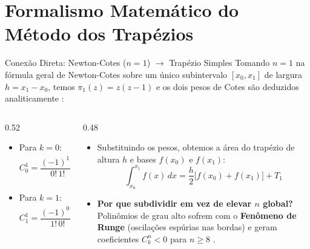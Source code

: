 \documentclass[aspectratio=169]{beamer}
\newcommand{\emphred}[1]{\textcolor{secondary}{\textbf{#1}}}
\begin{document}
\section{Formalismo Matemático do Método dos Trapézios}

\begin{frame}{Conexão Direta: Newton-Cotes ($n=1$) $\rightarrow$ Trapézio Simples}
\footnotesize
Tomando $n = 1$ na fórmula geral de Newton-Cotes sobre um único subintervalo $[x_0, x_1]$ de largura $h = x_1 - x_0$, temos $\pi_1(z) = z(z - 1)$ e os dois pesos de Cotes são deduzidos analiticamente \cite{santos2010, mesquita2026}:

\begin{columns}[T]
\begin{column}{0.52\textwidth}
\begin{bee}
\begin{itemize}\scriptsize
    \item Para $k = 0$:
    \[
    C_0^1 = \frac{(-1)^1 h}{0!\,1!} \int_0^1 (z - 1)\,dz = -h \left[\frac{z^2}{2} - z\right]_0^1 = \frac{h}{2}
    \]
    \item Para $k = 1$:
    \[
    C_1^1 = \frac{(-1)^0 h}{1!\,0!} \int_0^1 z\,dz = h \left[\frac{z^2}{2}\right]_0^1 = \frac{h}{2}
    \]
\end{itemize}
\end{bee}
\end{column}

\begin{column}{0.48\textwidth}
\begin{bee}
\begin{itemize}\scriptsize
    \item Substituindo os pesos, obtemos a área do trapézio de altura $h$ e bases $f(x_0)$ e $f(x_1)$:
    \[
    \int_{x_0}^{x_1} f(x)\,dx = \frac{h}{2}\big[f(x_0) + f(x_1)\big] + T_1
    \]
    \item \emphred{Por que subdividir em vez de elevar $n$ global?} Polinômios de grau alto sofrem com o \textbf{Fenômeno de Runge} (oscilações espúrias nas bordas) e geram coeficientes $C_k^n < 0$ para $n \ge 8$ \cite{ruggiero1996, burden2016}.
\end{itemize}
\end{bee}
\end{column}
\end{columns}
\end{frame}
\end{document}
